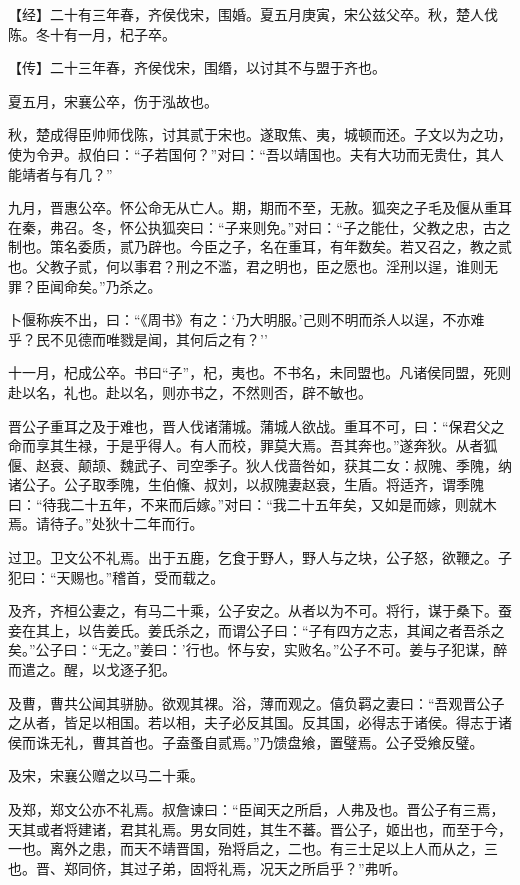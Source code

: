 \documentclass[]{article}
\begin{document}
【经】二十有三年春，齐侯伐宋，围婚。夏五月庚寅，宋公兹父卒。秋，楚人伐陈。冬十有一月，杞子卒。

【传】二十三年春，齐侯伐宋，围缗，以讨其不与盟于齐也。

夏五月，宋襄公卒，伤于泓故也。

秋，楚成得臣帅师伐陈，讨其贰于宋也。遂取焦、夷，城顿而还。子文以为之功，使为令尹。叔伯曰：``子若国何？''对曰：``吾以靖国也。夫有大功而无贵仕，其人能靖者与有几？''

九月，晋惠公卒。怀公命无从亡人。期，期而不至，无赦。狐突之子毛及偃从重耳在秦，弗召。冬，怀公执狐突曰：``子来则免。''对曰：``子之能仕，父教之忠，古之制也。策名委质，贰乃辟也。今臣之子，名在重耳，有年数矣。若又召之，教之贰也。父教子贰，何以事君？刑之不滥，君之明也，臣之愿也。淫刑以逞，谁则无罪？臣闻命矣。''乃杀之。

卜偃称疾不出，曰：``《周书》有之：`乃大明服。'己则不明而杀人以逞，不亦难乎？民不见德而唯戮是闻，其何后之有？''

十一月，杞成公卒。书曰``子''，杞，夷也。不书名，未同盟也。凡诸侯同盟，死则赴以名，礼也。赴以名，则亦书之，不然则否，辟不敏也。

晋公子重耳之及于难也，晋人伐诸蒲城。蒲城人欲战。重耳不可，曰：``保君父之命而享其生禄，于是乎得人。有人而校，罪莫大焉。吾其奔也。''遂奔狄。从者狐偃、赵衰、颠颉、魏武子、司空季子。狄人伐啬咎如，获其二女：叔隗、季隗，纳诸公子。公子取季隗，生伯儵、叔刘，以叔隗妻赵衰，生盾。将适齐，谓季隗曰：``待我二十五年，不来而后嫁。''对曰：``我二十五年矣，又如是而嫁，则就木焉。请待子。''处狄十二年而行。

过卫。卫文公不礼焉。出于五鹿，乞食于野人，野人与之块，公子怒，欲鞭之。子犯曰：``天赐也。''稽首，受而载之。

及齐，齐桓公妻之，有马二十乘，公子安之。从者以为不可。将行，谋于桑下。蚕妾在其上，以告姜氏。姜氏杀之，而谓公子曰：``子有四方之志，其闻之者吾杀之矣。''公子曰：``无之。''姜曰：'行也。怀与安，实败名。''公子不可。姜与子犯谋，醉而遣之。醒，以戈逐子犯。

及曹，曹共公闻其骈胁。欲观其裸。浴，薄而观之。僖负羁之妻曰：``吾观晋公子之从者，皆足以相国。若以相，夫子必反其国。反其国，必得志于诸侯。得志于诸侯而诛无礼，曹其首也。子盍蚤自贰焉。''乃馈盘飨，置璧焉。公子受飨反璧。

及宋，宋襄公赠之以马二十乘。

及郑，郑文公亦不礼焉。叔詹谏曰：``臣闻天之所启，人弗及也。晋公子有三焉，天其或者将建诸，君其礼焉。男女同姓，其生不蕃。晋公子，姬出也，而至于今，一也。离外之患，而天不靖晋国，殆将启之，二也。有三士足以上人而从之，三也。晋、郑同侪，其过子弟，固将礼焉，况天之所启乎？''弗听。
\end{document}

